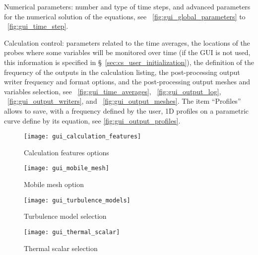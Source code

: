 {{\begin{list}{-}{}
\item Numerical parameters: number and type of time steps, and advanced parameters for the numerical solution of the equations,
see \figurename~\ref{fig:gui_global_parameters} to \figurename~\ref{fig:gui_time_step}.
\item Calculation control: parameters related to the time averages, the
      locations of the probes where some variables will be monitored over time
      (if the GUI is not used, this information is specified in \S~\ref{sec:cs_user_initialization}),
       the definition of the frequency of the outputs in the calculation
      listing, the post-processing output writer frequency and format options, and
      the post-processing output meshes and variables selection, see
      \figurename~\ref{fig:gui_time_averages}, \figurename~\ref{fig:gui_output_log}, \figurename~\ref{fig:gui_output_writers},
      and \figurename~\ref{fig:gui_output_meshes}. The item ``Profiles'' allows to save, with a
      frequency defined by the user, 1D profiles on a parametric curve define by its equation, see \figurename\ref{fig:gui_output_profiles}.
\end{list}

\begin{figure}[!ht]
\begin{center}
\texttt{[image: gui\_calculation\_features]}
\caption{Calculation features options}
\label{fig:gui_calculation_features}
\end{center}
\end{figure}

\begin{figure}[!ht]
\begin{center}
\texttt{[image: gui\_mobile\_mesh]}
\caption{Mobile mesh option}
\label{fig:gui_mobile_mesh}
\end{center}
\end{figure}

\begin{figure}[!ht]
\begin{center}
\texttt{[image: gui\_turbulence\_models]}
\caption{Turbulence model selection}
\label{fig:gui_turbulence_models}
\end{center}
\end{figure}

\begin{figure}[!ht]
\begin{center}
\texttt{[image: gui\_thermal\_scalar]}
\caption{Thermal scalar selection}
\label{fig:gui_thermal_scalar}
\end{center}
\end{figure}

}}
